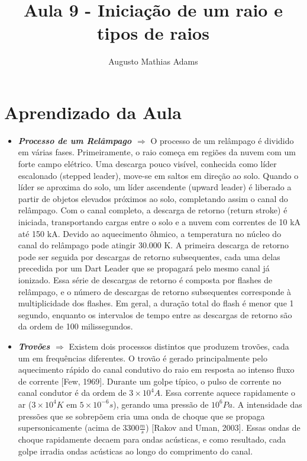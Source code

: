 \documentclass[a4paper, 12pt, onecolumn,singlespacing]{article}
\title{Aula 9 - Iniciação de um raio e tipos de raios}
\author[1]{Augusto Mathias Adams}
\affil[1]{augusto.adams@ufpr.br}
\begin{document}
	
	\maketitle
	
	\section{Aprendizado da Aula}
	
	\begin{itemize}
		\item \textbf{\textit{Processo de um Relâmpago $\Rightarrow$ }} O processo de um relâmpago é dividido em várias fases. Primeiramente, o raio começa em regiões da nuvem com um forte campo elétrico. Uma descarga pouco visível, conhecida como líder escalonado (stepped leader), move-se em saltos em direção ao solo. Quando o líder se aproxima do solo, um líder ascendente (upward leader) é liberado a partir de objetos elevados próximos ao solo, completando assim o canal do relâmpago. Com o canal completo, a descarga de retorno (return stroke) é iniciada, transportando cargas entre o solo e a nuvem com correntes de 10 kA até 150 kA. Devido ao aquecimento ôhmico, a temperatura no núcleo do canal do relâmpago pode atingir 30.000 K. A primeira descarga de retorno pode ser seguida por descargas de retorno subsequentes, cada uma delas precedida por um Dart Leader que se propagará pelo mesmo canal já ionizado. Essa série de descargas de retorno é composta por flashes de relâmpago, e o número de descargas de retorno subsequentes corresponde à multiplicidade dos flashes. Em geral, a duração total do flash é menor que 1 segundo, enquanto os intervalos de tempo entre as descargas de retorno são da ordem de 100 milissegundos.
		
		\item \textbf{\textit{Trovões $\Rightarrow$ }}Existem dois processos distintos que produzem trovões, cada um em frequências diferentes. O trovão é gerado principalmente pelo aquecimento rápido do canal condutivo do raio em resposta ao intenso fluxo de corrente [Few, 1969]. Durante um golpe típico, o pulso de corrente no canal condutor é da ordem de $3 \times 10^4 A$. Essa corrente aquece rapidamente o ar ($3 \times 10^4K$ em $5 \times 10^{-6} s$), gerando uma pressão de $10^6Pa$. A intensidade das pressões que se sobrepõem cria uma onda de choque que se propaga supersonicamente (acima de $3300 \frac{m}{s}$) [Rakov and Uman, 2003]. Essas ondas de choque rapidamente decaem para ondas acústicas, e como resultado, cada golpe irradia ondas acústicas ao longo do comprimento do canal.
		

\end{itemize}
\end{document}
